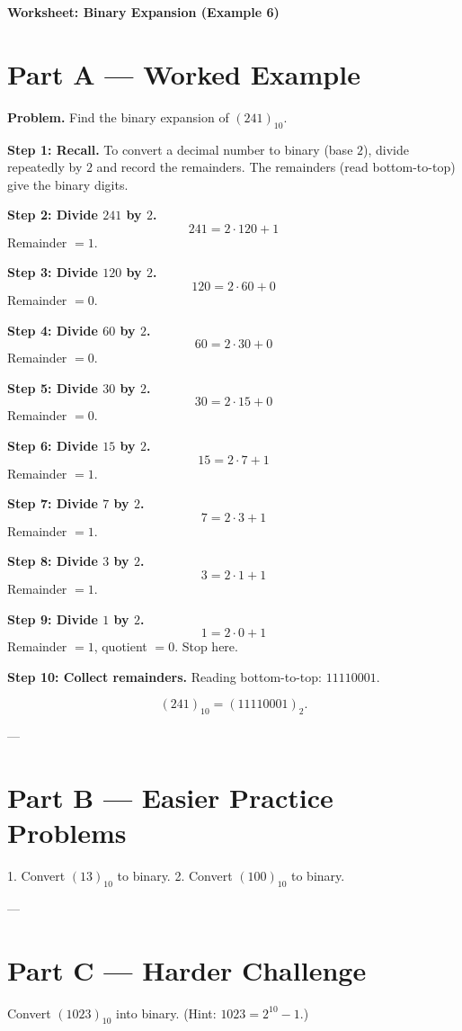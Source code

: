 \documentclass[12pt]{article}
\begin{document}
\begin{center}
\Large\textbf{Worksheet: Binary Expansion (Example 6)}
\end{center}

\section*{Part A — Worked Example}

\textbf{Problem.} Find the binary expansion of $(241)_{10}$.

\textbf{Step 1: Recall.} To convert a decimal number to binary (base $2$), divide repeatedly by $2$ and record the remainders. The remainders (read bottom-to-top) give the binary digits.

\medskip
\textbf{Step 2: Divide $241$ by $2$.}
\[
241 = 2 \cdot 120 + 1
\]
Remainder $=1$.

\medskip
\textbf{Step 3: Divide $120$ by $2$.}
\[
120 = 2 \cdot 60 + 0
\]
Remainder $=0$.

\medskip
\textbf{Step 4: Divide $60$ by $2$.}
\[
60 = 2 \cdot 30 + 0
\]
Remainder $=0$.

\medskip
\textbf{Step 5: Divide $30$ by $2$.}
\[
30 = 2 \cdot 15 + 0
\]
Remainder $=0$.

\medskip
\textbf{Step 6: Divide $15$ by $2$.}
\[
15 = 2 \cdot 7 + 1
\]
Remainder $=1$.

\medskip
\textbf{Step 7: Divide $7$ by $2$.}
\[
7 = 2 \cdot 3 + 1
\]
Remainder $=1$.

\medskip
\textbf{Step 8: Divide $3$ by $2$.}
\[
3 = 2 \cdot 1 + 1
\]
Remainder $=1$.

\medskip
\textbf{Step 9: Divide $1$ by $2$.}
\[
1 = 2 \cdot 0 + 1
\]
Remainder $=1$, quotient $=0$. Stop here.

\medskip
\textbf{Step 10: Collect remainders.} Reading bottom-to-top: $11110001$.

\[
(241)_{10} = (11110001)_{2}.
\]


---

\section*{Part B — Easier Practice Problems}
1. Convert $(13)_{10}$ to binary.  
2. Convert $(100)_{10}$ to binary.  

\vspace{2cm}

---

\section*{Part C — Harder Challenge}
Convert $(1023)_{10}$ into binary. (Hint: $1023 = 2^{10} - 1$.)

\vspace{3cm}
\end{document}
